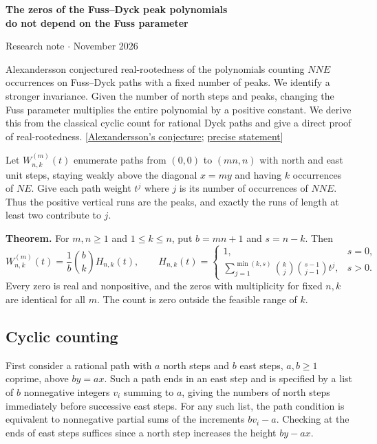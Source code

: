 \documentclass[11pt]{article}
\begin{document}
\begin{center}{\Large\bfseries The zeros of the Fuss--Dyck peak polynomials\\ do not depend on the Fuss parameter}\par
\small Research note \enspace$\cdot$ November 2026\end{center}

Alexandersson conjectured real-rootedness of the polynomials counting $NNE$ occurrences on Fuss--Dyck paths with a fixed number of peaks. We identify a stronger invariance. Given the number of north steps and peaks, changing the Fuss parameter multiplies the entire polynomial by a positive constant. We derive this from the classical cyclic count for rational Dyck paths and give a direct proof of real-rootedness. [\href{https://www.symmetricfunctions.com/realRootedCatalan.htm}{Alexandersson's conjecture}; \href{https://www.symmetricfunctions.com/realRootedOpenProblems.htm}{precise statement}]

Let $W^{(m)}_{n,k}(t)$ enumerate paths from $(0,0)$ to $(mn,n)$ with north and east unit steps, staying weakly above the diagonal $x=my$ and having $k$ occurrences of $NE$. Give each path weight $t^j$ where $j$ is its number of occurrences of $NNE$. Thus the positive vertical runs are the peaks, and exactly the runs of length at least two contribute to $j$.

\textbf{Theorem.} For $m,n\ge1$ and $1\le k\le n$, put $b=mn+1$ and $s=n-k$. Then
\[
 W^{(m)}_{n,k}(t)=\frac1b\binom{b}{k}H_{n,k}(t),\qquad
 H_{n,k}(t)=
 \begin{cases}
 1,&s=0,\\
 \displaystyle\sum_{j=1}^{\min(k,s)}\binom{k}{j}\binom{s-1}{j-1}t^j,&s>0 .
 \end{cases}
\]
Every zero is real and nonpositive, and the zeros with multiplicity for fixed $n,k$ are identical for all $m$. The count is zero outside the feasible range of $k$.

\subsection*{Cyclic counting}
First consider a rational path with $a$ north steps and $b$ east steps, $a,b\ge1$ coprime, above $by=ax$. Such a path ends in an east step and is specified by a list of $b$ nonnegative integers $v_i$ summing to $a$, giving the numbers of north steps immediately before successive east steps. For any such list, the path condition is equivalent to nonnegative partial sums of the increments $bv_i-a$. Checking at the ends of east steps suffices since a north step increases the height $by-ax$.
\end{document}
